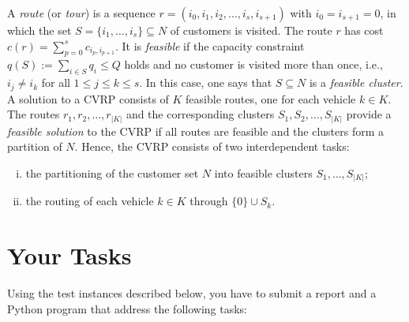 A \emph{route} (or \emph{tour}) is a sequence
$r=(i_0,i_1,i_2,\ldots,i_s,i_{s+1})$ with $i_0=i_{s+1}=0$, in which the
set $S=\{i_1,\ldots,i_s\}\subseteq N$ of customers is visited. The route
$r$ has cost $c(r)=\sum_{p=0}^sc_{i_p,i_{p+1}}$. It is \emph{feasible}
if the capacity constraint $q(S):=\sum_{i\in S}q_i\leq Q$ holds and no
customer is visited more than once, i.e., $i_j\neq i_k$ for all $1\leq
j\leq k\leq s$. In this case, one says that $S\subseteq N$ is a
\emph{feasible cluster}. A solution to a CVRP consists of $K$ feasible
routes, one for each vehicle $k\in K$. The routes
$r_1,r_2,\ldots,r_{|K|}$ and the corresponding clusters
$S_1,S_2,\ldots,S_{|K|}$ provide a \emph{feasible solution} to the CVRP
if all routes are feasible and the clusters form a partition of
$N$. Hence, the CVRP consists of two interdependent tasks:
\begin{enumerate}[(i)]
\item the partitioning of the customer set $N$ into feasible clusters
  $S_1,\ldots,S_{|K|}$;
\item the routing of each vehicle $k\in K$ through $\{0\}\cup S_k$.
\end{enumerate}



\section{Your Tasks}
\medskip

Using the test instances described below, you have to submit a report and a
Python program that address the following tasks:


